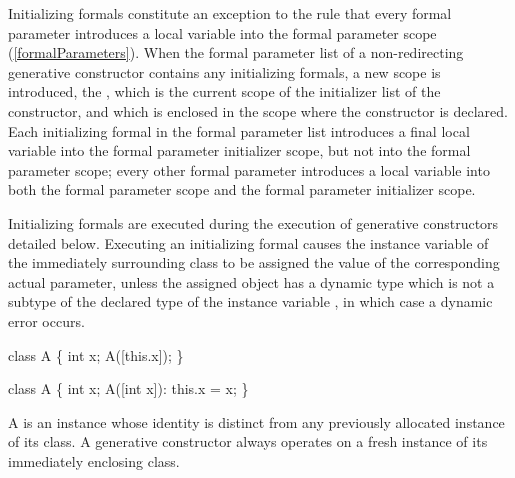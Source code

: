 \documentclass[makeidx]{article}
\begin{document}
\LMHash{}%
Initializing formals constitute an exception to the rule that
every formal parameter introduces a local variable into
the formal parameter scope (\ref{formalParameters}).
When the formal parameter list of a non-redirecting generative constructor
contains any initializing formals, a new scope is introduced, the
,
which is the current scope of the initializer list of the constructor,
and which is enclosed in the scope where the constructor is declared.
Each initializing formal in the formal parameter list introduces a final local variable into the formal parameter initializer scope, but not into the formal parameter scope; every other formal parameter introduces a local variable into both the formal parameter scope and the formal parameter initializer scope.


\LMHash{}%
Initializing formals are executed during
the execution of generative constructors detailed below.
Executing an initializing formal 
causes the instance variable \id{} of the immediately surrounding class
to be assigned the value of the corresponding actual parameter,
unless the assigned object has a dynamic type
which is not a subtype of the declared type of the instance variable \id{},
in which case a dynamic error occurs.


\begin{dartCode}
class A \{
  int x;
  A([this.x]);
\}
\end{dartCode}


\begin{dartCode}
class A \{
  int x;
  A([int x]): this.x = x;
\}
\end{dartCode}

\LMHash{}%
A  is an instance whose identity is distinct from any previously allocated instance of its class.
A generative constructor always operates on a fresh instance of its immediately enclosing class.
\end{document}
